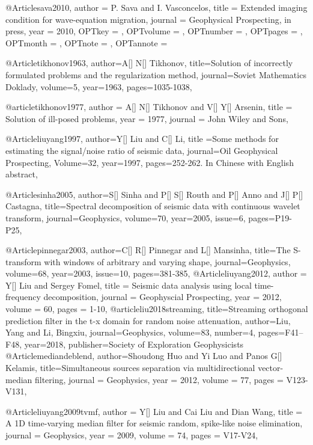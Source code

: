 @Article{sava2010,
  author = 	 {P. Sava and I. Vasconcelos},
  title = 	 {Extended imaging condition for wave-equation migration},
  journal = 	 {Geophysical Prospecting, in press},
  year = 	 {2010},
  OPTkey = 	 {},
  OPTvolume = 	 {},
  OPTnumber = 	 {},
  OPTpages = 	 {},
  OPTmonth = 	 {},
  OPTnote = 	 {},
  OPTannote = 	 {}
}



@Article{tikhonov1963,
author={A[] N[] Tikhonov},
title={Solution of incorrectly formulated problems and the regularization method},
journal={Soviet Mathematics Doklady},
volume=5,
year=1963,
pages={1035-1038},
}

@article{tikhonov1977,
  author =	 {A[] N[] Tikhonov and V[] Y[] Arsenin},
  title =	 {Solution of ill-posed problems},
  year =	 1977,
  journal =	 {John Wiley and Sons},
}

@Article{liuyang1997,
  author={Y[] Liu and C[] Li},
  title ={Some methods for estimating the signal/noise ratio of seismic data},
  journal={Oil Geophysical Prospecting},
  Volume=32,
  year=1997,
  pages={252-262. In Chinese with English abstract},
}

@Article{sinha2005,
author={S[] Sinha and P[] S[] Routh and P[] Anno and J[] P[] Castagna},
title={Spectral decomposition of seismic data with continuous wavelet transform},
journal={Geophysics},
volume=70,
year=2005,
issue=6,
pages={P19-P25},
}

@Article{pinnegar2003,
author={C[] R[] Pinnegar and L[] Mansinha},
title={The S-transform with windows of arbitrary and varying shape},
journal={Geophysics},
volume=68,
year=2003,
issue=10,
pages={381-385},
}
@Article{liuyang2012,
  author = 	 {Y[] Liu and Sergey Fomel},
  title = 	 {Seismic data analysis using local time-frequency decomposition},
  journal = 	 {Geophyscial Prospecting},
  year = 	 2012,
  volume =	 60,
  pages =	 {1-10},
}
@article{liu2018streaming,
  title={Streaming orthogonal prediction filter in the t-x domain for random noise attenuation},
  author={Liu, Yang and Li, Bingxiu},
  journal={Geophysics},
  volume={83},
  number={4},
  pages={F41--F48},
  year={2018},
  publisher={Society of Exploration Geophysicists}
}
@Article{mediandeblend,
  author={Shoudong Huo and Yi Luo and Panos G[] Kelamis},
  title={Simultaneous sources separation via multidirectional vector-median filtering},
  journal = 	 {Geophysics},
  year = 	 2012,
  volume =	 77,
  pages =	 {V123-V131},
}

@Article{liuyang2009tvmf,
  author = 	 {Y[] Liu and Cai Liu and Dian Wang},
  title = 	 {A 1D time-varying median filter for seismic random, spike-like noise elimination},
  journal = 	 {Geophysics},
  year = 	 2009,
  volume =	 74,
  pages =	 {V17-V24},
}

